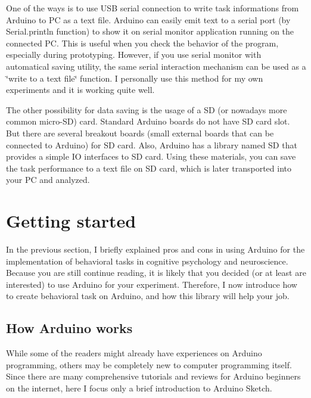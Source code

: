 One of the ways is to use U\+SB serial connection to write task informations from Arduino to PC as a text file. Arduino can easily emit text to a serial port (by {\ttfamily Serial.\+println} function) to show it on serial monitor application running on the connected PC. This is useful when you check the behavior of the program, especially during prototyping. However, if you use serial monitor with automatical saving utility, the same serial interaction mechanism can be used as a \char`\"{}write to a text file\char`\"{} function. I personally use this method for my own experiments and it is working quite well.

The other possibility for data saving is the usage of a SD (or nowadays more common micro-\/\+SD) card. Standard Arduino boards do not have SD card slot. But there are several breakout boards (small external boards that can be connected to Arduino) for SD card. Also, Arduino has a library named {\ttfamily SD} that provides a simple IO interfaces to SD card. Using these materials, you can save the task performance to a text file on SD card, which is later transported into your PC and analyzed.\hypertarget{index_s2}{}\section{Getting started}\label{index_s2}
In the previous section, I briefly explained pros and cons in using Arduino for the implementation of behavioral tasks in cognitive psychology and neuroscience. Because you are still continue reading, it is likely that you decided (or at least are interested) to use Arduino for your experiment. Therefore, I now introduce how to create behavioral task on Arduino, and how this library will help your job.\hypertarget{index_s2ss1}{}\subsection{How Arduino works}\label{index_s2ss1}
While some of the readers might already have experiences on Arduino programming, others may be completely new to computer programming itself. Since there are many comprehensive tutorials and reviews for Arduino beginners on the internet, here I focus only a brief introduction to Arduino Sketch.

